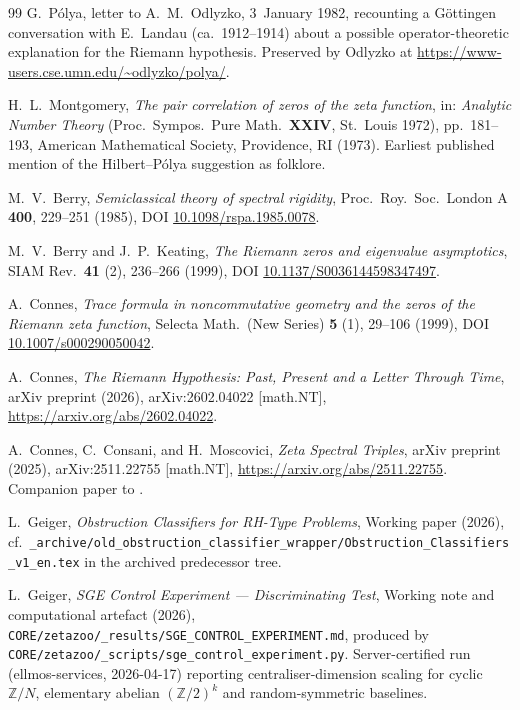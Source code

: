 \documentclass[11pt]{article}
\theoremstyle{definition}
\theoremstyle{remark}
\begin{document}
\begin{thebibliography}{99}
G.~P\'olya, letter to A.~M.~Odlyzko, 3~January 1982, recounting a
Göttingen conversation with E.~Landau (ca.\ 1912--1914) about a
possible operator-theoretic explanation for the Riemann hypothesis.
Preserved by Odlyzko at
\url{https://www-users.cse.umn.edu/~odlyzko/polya/}.

H.~L.~Montgomery, \emph{The pair correlation of zeros of the zeta
function}, in: \emph{Analytic Number Theory} (Proc.\ Sympos.\ Pure
Math.\ \textbf{XXIV}, St.\ Louis 1972), pp.~181--193, American
Mathematical Society, Providence, RI (1973). Earliest published
mention of the Hilbert--P\'olya suggestion as folklore.

M.~V.~Berry, \emph{Semiclassical theory of spectral rigidity},
Proc.\ Roy.\ Soc.\ London A \textbf{400}, 229--251 (1985), DOI
\href{https://doi.org/10.1098/rspa.1985.0078}{10.1098/rspa.1985.0078}.

M.~V.~Berry and J.~P.~Keating, \emph{The Riemann zeros and
eigenvalue asymptotics}, SIAM Rev.\ \textbf{41} (2), 236--266 (1999),
DOI
\href{https://doi.org/10.1137/S0036144598347497}{10.1137/S0036144598347497}.

A.~Connes, \emph{Trace formula in noncommutative geometry and the
zeros of the Riemann zeta function}, Selecta Math.\ (New Series)
\textbf{5} (1), 29--106 (1999), DOI
\href{https://doi.org/10.1007/s000290050042}{10.1007/s000290050042}.

A.~Connes, \emph{The Riemann Hypothesis: Past, Present and a
Letter Through Time}, arXiv preprint (2026), arXiv:2602.04022
[math.NT], \url{https://arxiv.org/abs/2602.04022}.

A.~Connes, C.~Consani, and H.~Moscovici, \emph{Zeta Spectral
Triples}, arXiv preprint (2025), arXiv:2511.22755 [math.NT],
\url{https://arxiv.org/abs/2511.22755}. Companion paper to
\cite{Connes2026}.

L.~Geiger, \emph{Obstruction Classifiers for RH-Type Problems},
Working paper (2026), cf.\ \texttt{\_archive/old\_obstruction\_classifier\_wrapper/Obstruction\_Classifiers\_v1\_en.tex}
in the archived predecessor tree.

L.~Geiger, \emph{SGE Control Experiment --- Discriminating Test},
Working note and computational artefact (2026),
\texttt{CORE/zetazoo/\_results/SGE\_CONTROL\_EXPERIMENT.md},
produced by
\texttt{CORE/zetazoo/\_scripts/sge\_control\_experiment.py}.
Server-certified run (ellmos-services, 2026-04-17) reporting
centraliser-dimension scaling for cyclic $\mathbb{Z}/N$,
elementary abelian $(\mathbb{Z}/2)^k$ and random-symmetric
baselines.


\end{thebibliography}
\end{document}
